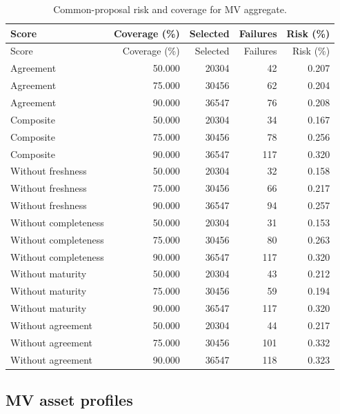\documentclass[11pt]{article}
\begin{document}
\small\begin{longtable}{lrrrr}
\caption{Common-proposal risk and coverage for MV aggregate.}\\\toprule
Score & Coverage (\%) & Selected & Failures & Risk (\%)\\\midrule
\endfirsthead
\toprule
Score & Coverage (\%) & Selected & Failures & Risk (\%)\\\midrule
\endhead
\bottomrule\endfoot
Agreement & 50.000 & 20304 & 42 & 0.207\\
Agreement & 75.000 & 30456 & 62 & 0.204\\
Agreement & 90.000 & 36547 & 76 & 0.208\\
Composite & 50.000 & 20304 & 34 & 0.167\\
Composite & 75.000 & 30456 & 78 & 0.256\\
Composite & 90.000 & 36547 & 117 & 0.320\\
Without freshness & 50.000 & 20304 & 32 & 0.158\\
Without freshness & 75.000 & 30456 & 66 & 0.217\\
Without freshness & 90.000 & 36547 & 94 & 0.257\\
Without completeness & 50.000 & 20304 & 31 & 0.153\\
Without completeness & 75.000 & 30456 & 80 & 0.263\\
Without completeness & 90.000 & 36547 & 117 & 0.320\\
Without maturity & 50.000 & 20304 & 43 & 0.212\\
Without maturity & 75.000 & 30456 & 59 & 0.194\\
Without maturity & 90.000 & 36547 & 117 & 0.320\\
Without agreement & 50.000 & 20304 & 44 & 0.217\\
Without agreement & 75.000 & 30456 & 101 & 0.332\\
Without agreement & 90.000 & 36547 & 118 & 0.323\\
\end{longtable}\normalsize
{}\subsection{MV asset profiles}
\end{document}
